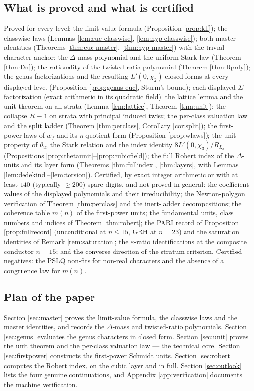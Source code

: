 \documentclass[11pt]{amsart}
\numberwithin{equation}{section}
\theoremstyle{plain}
\theoremstyle{definition}
\theoremstyle{remark}
\newcommand{\eps}{\varepsilon}
\begin{document}
\subsection*{What is proved and what is certified}
Proved for every level: the limit-value formula (Proposition
\ref{prop:klf}); the classwise laws (Lemmas \ref{lem:euc-classwise},
\ref{lem:hyp-classwise}); both master identities (Theorems
\ref{thm:euc-master}, \ref{thm:hyp-master}) with the trivial-character
anchor; the $\Delta$-mass polynomial and the uniform Stark law (Theorem
\ref{thm:Dn}); the rationality of the twisted-ratio polynomial (Theorem
\ref{thm:Rpoly}); the genus factorizations and the resulting $L'(0,\chi_2)$
closed forms at every displayed level (Proposition \ref{prop:genus-euc},
Sturm's bound); each displayed $\Sigma$-factorization (exact arithmetic in
its quadratic field); the lattice lemma and the unit theorem on all strata
(Lemma \ref{lem:lattice}, Theorem \ref{thm:unit}); the collapse $R \equiv 1$
on strata with principal induced twist; the per-class valuation law and
the split ladder (Theorem \ref{thm:perclass}, Corollary \ref{cor:split});
the first-power laws of $w_f$ and its $\eta$-quotient form (Proposition
\ref{prop:wlaws}); the unit property of $\theta_u$, the Stark relation and
the index identity $8L'(0,\chi_3)/R_{L_3}$ (Propositions
\ref{prop:thetaunit}--\ref{prop:cubicfield}); the full Robert index of the
$\Delta$-units and its layer form (Theorems \ref{thm:fullindex},
\ref{thm:layers}, with Lemmas \ref{lem:dedekind}--\ref{lem:torsion}).
Certified, by exact
integer arithmetic or with at least $140$ (typically $\ge 200$) spare
digits, and not proved in general: the coefficient values of the displayed
polynomials and their irreducibility; the Newton-polygon verification of
Theorem \ref{thm:perclass} and the inert-ladder decompositions; the
coherence table $m(n)$ of the first-power units; the fundamental units,
class numbers and indices of Theorem \ref{thm:robert}; the PARI record of
Proposition \ref{prop:fullrecord} (unconditional at $n \le 15$, GRH at
$n = 23$) and the saturation identities of Remark \ref{rem:saturation}; the
$\eps$-ratio identifications at the composite conductor $n = 15$; and the
converse direction of the stratum criterion.  Certified negatives: the
PSLQ non-fits for non-real characters and the absence of a congruence
law for $m(n)$.

\subsection*{Plan of the paper}
Section \ref{sec:master} proves the limit-value formula, the classwise
laws and the master identities, and records the $\Delta$-mass and
twisted-ratio polynomials.  Section \ref{sec:genus} evaluates the genus
characters in closed form.  Section \ref{sec:unit} proves the unit theorem
and the per-class valuation law --- the technical core.  Section
\ref{sec:firstpower} constructs the first-power Schmidt units.  Section
\ref{sec:robert} computes the Robert index, on the cubic layer and in full.  Section \ref{sec:outlook}
lists the four genuine continuations, and Appendix \ref{app:verification}
documents the machine verification.
\end{document}
